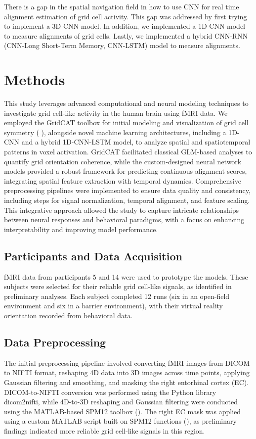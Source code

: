 \documentclass[a4paper]{article}
\begin{document}
There is a gap in the spatial navigation field in how to use CNN for real time alignment estimation of grid cell activity. This gap was addressed by first trying to implement a 3D CNN model. In addition, we implemented a 1D CNN model to measure alignments of grid cells. Lastly, we implemented a hybrid CNN-RNN (CNN-Long Short-Term Memory, CNN-LSTM) model to measure alignments.  

\section{Methods}
\label{sec:methods}

\noindent This study leverages advanced computational and neural modeling techniques to investigate grid cell-like activity in the human brain using fMRI data. We employed the GridCAT toolbox for initial modeling and visualization of grid cell symmetry (\cite{stangl_gridcat_2017-1} ), alongside novel machine learning architectures, including a 1D-CNN and a hybrid 1D-CNN-LSTM model, to analyze spatial and spatiotemporal patterns in voxel activation. GridCAT facilitated classical GLM-based analyses to quantify grid orientation coherence, while the custom-designed neural network models provided a robust framework for predicting continuous alignment scores, integrating spatial feature extraction with temporal dynamics. Comprehensive preprocessing pipelines were implemented to ensure data quality and consistency, including steps for signal normalization, temporal alignment, and feature scaling. This integrative approach allowed the study to capture intricate relationships between neural responses and behavioral paradigms, with a focus on enhancing interpretability and improving model performance. 


\subsection{Participants and Data Acquisition}
fMRI data from participants 5 and 14 were used to prototype the models. These subjects were selected for their reliable grid cell-like signals, as identified in preliminary analyses. Each subject completed 12 runs (six in an open-field environment and six in a barrier environment), with their virtual reality orientation recorded from behavioral data.

\subsection{Data Preprocessing}
The initial preprocessing pipeline involved converting fMRI images from DICOM to NIFTI format, reshaping 4D data into 3D images across time points, applying Gaussian filtering and smoothing, and masking the right entorhinal cortex (EC). DICOM-to-NIFTI conversion was performed using the Python library dicom2nifti, while 4D-to-3D reshaping and Gaussian filtering were conducted using the MATLAB-based SPM12 toolbox (\cite{noauthor_spm12_nodate}). The right EC mask was applied using a custom MATLAB script built on SPM12 functions (\cite{noauthor_simurgh818bmed8803_dl_project_nodate}), as preliminary findings indicated more reliable grid cell-like signals in this region.
\end{document}
